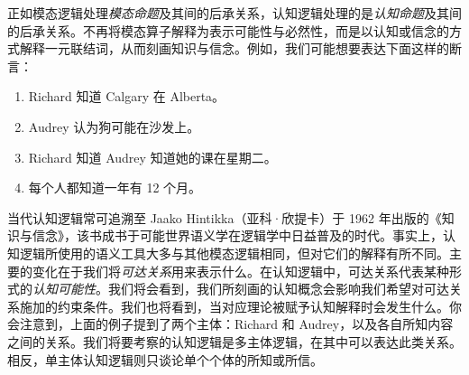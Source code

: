 \documentclass[../../../include/open-logic-section]{subfiles}
\begin{document}


正如模态逻辑处理\emph{模态命题}及其间的后承关系，认知逻辑处理的是\emph{认知命题}及其间的后承关系。不再将模态算子解释为表示可能性与必然性，而是以认知或信念的方式解释一元联结词，从而刻画知识与信念。例如，我们可能想要表达下面这样的断言：

\begin{enumerate}
\item Richard 知道 Calgary 在 Alberta。
\item Audrey 认为狗可能在沙发上。
\item Richard 知道 Audrey 知道她的课在星期二。
\item 每个人都知道一年有 12 个月。
\end{enumerate}

当代认知逻辑常可追溯至 Jaako Hintikka（亚科·欣提卡）于 1962 年出版的《知识与信念》，该书成书于可能世界语义学在逻辑学中日益普及的时代。事实上，认知逻辑所使用的语义工具大多与其他模态逻辑相同，但对它们的解释有所不同。主要的变化在于我们将\emph{可达关系}用来表示什么。在认知逻辑中，可达关系代表某种形式的\emph{认知可能性}。我们将会看到，我们所刻画的认知概念会影响我们希望对可达关系施加的约束条件。我们也将看到，当对应理论被赋予认知解释时会发生什么。你会注意到，上面的例子提到了两个主体：Richard 和 Audrey，以及各自所知内容之间的关系。我们将要考察的认知逻辑是多主体逻辑，在其中可以表达此类关系。相反，单主体认知逻辑则只谈论单个个体的所知或所信。
\end{document}
